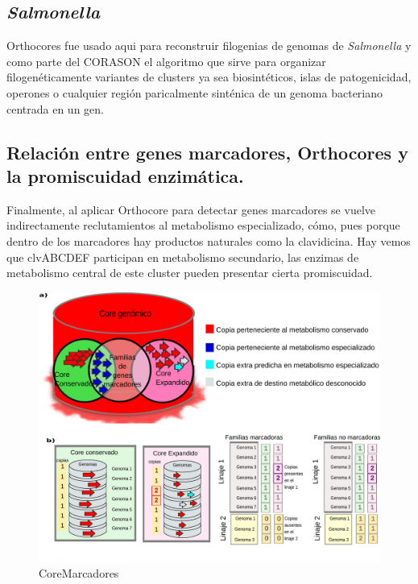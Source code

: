 \documentclass[]{article}
\begin{document}
\subsection{\texorpdfstring{\emph{Salmonella}}{Salmonella}}\label{salmonella}

Orthocores fue usado aqui para reconstruir filogenias de genomas de
\emph{Salmonella} y como parte del CORASON el algoritmo que sirve para
organizar filogenéticamente variantes de clusters ya sea biosintéticos,
islas de patogenicidad, operones o cualquier región paricalmente
sinténica de un genoma bacteriano centrada en un gen.

\subsection{Relación entre genes marcadores, Orthocores y la
promiscuidad
enzimática.}\label{relacion-entre-genes-marcadores-orthocores-y-la-promiscuidad-enzimatica.}

Finalmente, al aplicar Orthocore para detectar genes marcadores se
vuelve indirectamente reclutamientos al metabolismo especializado, cómo,
pues porque dentro de los marcadores hay productos naturales como la
clavidicina. Hay vemos que clvABCDEF participan en metabolismo
secundario, las enzimas de metabolismo central de este cluster pueden
presentar cierta promiscuidad.

\begin{figure}[h!tbp]
\centering
\includegraphics[angle = 0,scale = 1]{chapter1/CoreMarcadores.png}
\caption[CoreMarcadores]{\normalsize{CoreMarcadores}}
\label{fig:CoreMarcadores}
\end{figure}
\end{document}
